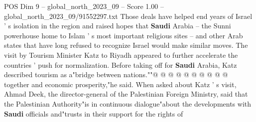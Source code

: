 \begin{textsample}{POS Dim 9 – global\_north\_2023\_09 – Score 1.00 – global\_north\_2023\_09/91552297.txt}
Those deals have helped end years of Israel ' s isolation in the region and raised hopes that \textbf{Saudi} Arabia -- the Sunni powerhouse home to Islam ' s most important religious sites -- and other Arab states that have long refused to recognize Israel would make similar moves.
The visit by Tourism Minister Katz to Riyadh appeared to further accelerate the countries ' push for normalization.
Before taking off for \textbf{Saudi} Arabia, Katz described tourism as a"bridge between nations.""@ @ @ @ @ @ @ @ @ @ together and economic prosperity,"he said.
When asked about Katz ' s visit, Ahmad Deek, the director-general of the Palestinian Foreign Ministry, said that the Palestinian Authority"is in continuous dialogue"about the developments with \textbf{Saudi} officials and"trusts in their support for the rights of

\end{textsample}
